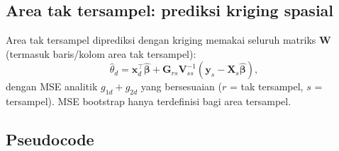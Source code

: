 \documentclass[11pt,a4paper]{article}
\theoremstyle{definition}
\begin{document}
\subsection{Area tak tersampel: prediksi kriging spasial}

Area tak tersampel diprediksi dengan kriging memakai seluruh matriks $\mathbf{W}$
(termasuk baris/kolom area tak tersampel):
\begin{equation}
  \hat{\theta}_d = \mathbf{x}_d^{\top}\hat{\boldsymbol{\beta}}
  + \mathbf{G}_{rs}\mathbf{V}_{ss}^{-1}(\mathbf{y}_s - \mathbf{X}_s\hat{\boldsymbol{\beta}}),
\end{equation}
dengan MSE analitik $g_{1d} + g_{2d}$ yang bersesuaian ($r$ = tak tersampel,
$s$ = tersampel). MSE bootstrap hanya terdefinisi bagi area tersampel.

\subsection{Pseudocode}
\end{document}
